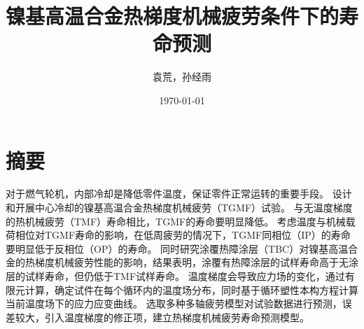 \documentclass{article}
\begin{document}
\title{镍基高温合金热梯度机械疲劳条件下的寿命预测}

\author{袁荒，孙经雨}
\date{\today}
\maketitle

\section*{摘要}
对于燃气轮机，内部冷却是降低零件温度，保证零件正常运转的重要手段。
设计和开展中心冷却的镍基高温合金热梯度机械疲劳（TGMF）试验。
与无温度梯度的热机械疲劳（TMF）寿命相比，TGMF的寿命要明显降低。
考虑温度与机械载荷相位对TGMF寿命的影响，在低周疲劳的情况下，TGMF同相位（IP）的寿命要明显低于反相位（OP）的寿命。
同时研究涂覆热障涂层（TBC）对镍基高温合金的热梯度机械疲劳性能的影响，结果表明，涂覆有热障涂层的试样寿命高于无涂层的试样寿命，但仍低于TMF试样寿命。
温度梯度会导致应力场的变化，通过有限元计算，确定试件在每个循环内的温度场分布，同时基于循环塑性本构方程计算当前温度场下的应力应变曲线。
选取多种多轴疲劳模型对试验数据进行预测，误差较大，引入温度梯度的修正项，建立热梯度机械疲劳寿命预测模型。
\end{document}
